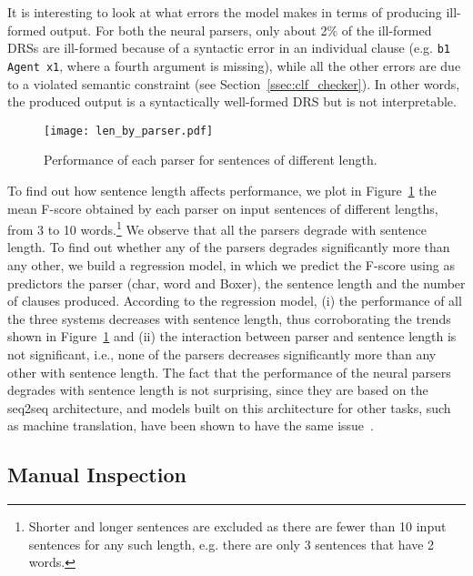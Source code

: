 \documentclass[11pt,a4paper]{article}
\begin{document}
It is interesting to look at what errors the model makes in terms of producing ill-formed output. For both the neural parsers, only about 2\% of the ill-formed DRSs are ill-formed because of a syntactic error in an individual clause (e.g. \texttt{b1 Agent x1}, where a fourth argument is missing), while all the other errors are due to a violated semantic constraint (see Section~\ref{ssec:clf_checker}). In other words, the produced output is a syntactically well-formed DRS but is not interpretable. 

\begin{figure}[!t]
\hspace*{-2.2mm}
  \texttt{[image: len\_by\_parser.pdf]}
  \caption{\label{fig:senlen}Performance of each parser for sentences of different length.}
\end{figure}

To find out how sentence length affects performance, we plot in Figure~\ref{fig:senlen} the mean F-score obtained by each parser on input sentences of different lengths, from 3 to 10 words.\footnote{Shorter and longer sentences are excluded as there are fewer than 10 input sentences for any such length, e.g. there are only 3 sentences that have 2 words.}
We observe that all the parsers degrade with sentence length.
To find out whether any of the parsers degrades significantly more than any other, 
we build a regression model, in which we predict the F-score 
using as predictors the parser (char, word and Boxer), the sentence length and the number of clauses produced. According to the regression model, (i) the performance of all the three systems decreases with sentence length, thus corroborating the trends shown in Figure~\ref{fig:senlen} and (ii) the interaction between parser and sentence length is not significant, i.e., none of the parsers decreases significantly more than any other with sentence length. 
The fact that the performance of the neural parsers degrades with sentence length is not surprising, since they are based on the seq2seq architecture, and models built on this architecture for other tasks, such as machine translation, have been shown to have the same issue~\cite{toral-sanchezcartagena:2017:EACLlong}.



\subsection{Manual Inspection}

\label{sec:manual}
\end{document}
